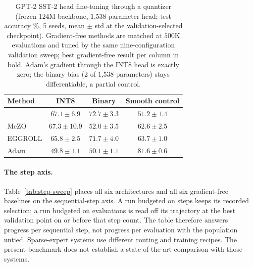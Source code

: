 \begin{table}[t]
\centering
\caption{GPT-2 SST-2 head fine-tuning through a quantizer (frozen 124M backbone, 1,538-parameter head; test accuracy \%, 5 seeds, mean $\pm$ std at the validation-selected checkpoint). Gradient-free methods are matched at $500$K evaluations and tuned by the same nine-configuration validation sweep; best gradient-free result per column in bold. Adam's gradient through the INT8 head is exactly zero; the binary bias (2 of 1,538 parameters) stays differentiable, a partial control.}
\label{tab:gpt2-headquant}
\small
\begin{tabular}{lccc}
\toprule
Method & INT8 & Binary & Smooth control \\
\midrule
\sysname{} & $67.1 \pm 6.9$ & $\mathbf{72.7 \pm 3.3}$ & $51.2 \pm 1.4$ \\
MeZO & $\mathbf{67.3 \pm 10.9}$ & $52.0 \pm 3.5$ & $62.6 \pm 2.5$ \\
EGGROLL & $65.8 \pm 2.5$ & $71.7 \pm 4.0$ & $\mathbf{63.7 \pm 1.0}$ \\
\midrule
Adam & $49.8 \pm 1.1$ & $50.1 \pm 1.1$ & $81.6 \pm 0.6$ \\
\bottomrule
\end{tabular}
\end{table}

\begin{table}[t]
\caption{Every method on every architecture at \emph{matched optimizer steps}: each baseline read at the step count \sysname{} spends ($3{,}180$; $6{,}330$ on hard MoE). Validation accuracy (\%), five-seed means (a truncated trajectory carries no test score); standard deviations in Table~\ref{tab:snn-accuracy} and Appendix~\ref{app:gallery-tables}. MNIST is the one column where \sysname{} reuses a transport plan and so evaluates on every third step (Section~\ref{sec:ablation}).}
\label{tab:step-sweep}
\centering
\small

\end{table}

\paragraph{The step axis.}
Table~\ref{tab:step-sweep} places all six architectures and all six gradient-free
baselines on the sequential-step axis. A run budgeted on steps keeps its recorded
selection; a run budgeted on evaluations is read off its trajectory at the best
validation point on or before that step count. The table therefore answers progress per
sequential step, not progress per evaluation with the population untied. Sparse-expert systems
\citep{fedus2022switch,lepikhin2021gshard,zhou2022expertchoice} use different
routing and training recipes. The present benchmark does not establish a
state-of-the-art comparison with those systems.

